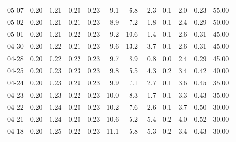 \begin{threeparttable}
{\begin{tabular}{lrrrrrrrrrrr}
  05-07 &          0.20 &          0.21 &          0.20 &        0.23 &                 9.1 &                 6.8 &        2.3 &                 0.1 &              2.0 &            0.23 &                  55.00 \\
  05-02 &          0.20 &          0.21 &          0.21 &        0.23 &                 8.9 &                 7.2 &        1.8 &                 0.1 &              2.4 &            0.29 &                  50.00 \\
  05-01 &          0.20 &          0.21 &          0.22 &        0.23 &                 9.2 &                10.6 &       -1.4 &                 0.1 &              2.6 &            0.31 &                  45.00 \\
  04-30 &          0.20 &          0.22 &          0.21 &        0.23 &                 9.6 &                13.2 &       -3.7 &                 0.1 &              2.6 &            0.31 &                  45.00 \\
  04-28 &          0.20 &          0.22 &          0.22 &        0.23 &                 9.7 &                 8.9 &        0.8 &                 0.0 &              2.4 &            0.29 &                  45.00 \\
  04-25 &          0.20 &          0.23 &          0.23 &        0.23 &                 9.8 &                 5.5 &        4.3 &                 0.2 &              3.4 &            0.42 &                  40.00 \\
  04-24 &          0.20 &          0.23 &          0.20 &        0.23 &                 9.9 &                 7.1 &        2.7 &                 0.1 &              3.6 &            0.45 &                  35.00 \\
  04-23 &          0.20 &          0.23 &          0.22 &        0.23 &                10.0 &                 8.3 &        1.7 &                 0.1 &              3.3 &            0.43 &                  35.00 \\
  04-22 &          0.20 &          0.24 &          0.20 &        0.23 &                10.2 &                 7.6 &        2.6 &                 0.1 &              3.7 &            0.50 &                  30.00 \\
  04-21 &          0.20 &          0.24 &          0.20 &        0.23 &                10.6 &                 5.2 &        5.4 &                 0.2 &              4.0 &            0.52 &                  30.00 \\
  04-18 &          0.20 &          0.25 &          0.22 &        0.23 &                11.1 &                 5.8 &        5.3 &                 0.2 &              3.4 &            0.43 &                  30.00 \\

\end{tabular}}
\end{threeparttable}
